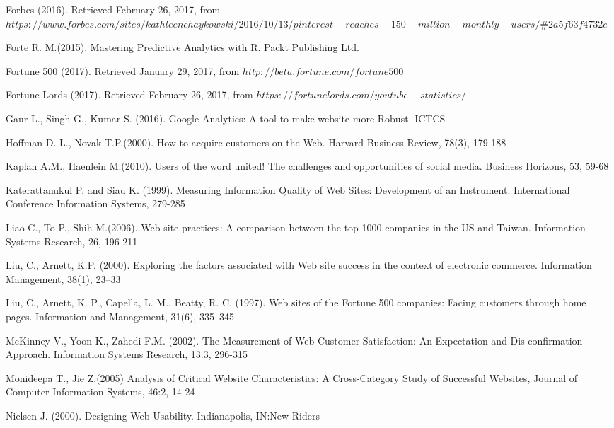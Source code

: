 \documentclass{book}
\begin{document}
\begin{thebibliography}{widest-label}
Forbes (2016). Retrieved February 26, 2017, from $https://www.forbes.com/sites/kathleenchaykowski/2016/10/13/pinterest-reaches-150-million-monthly-users/$\#$2a5f63f4732e$

Forte R. M.(2015). Mastering Predictive Analytics with R. Packt Publishing Ltd.

Fortune 500 (2017). Retrieved January 29, 2017, from $http://beta.fortune.com/fortune500$

Fortune Lords (2017). Retrieved February 26, 2017, from $https://fortunelords.com/youtube-statistics/$

Gaur L., Singh G., Kumar S. (2016). Google Analytics: A tool to make website more Robust. ICTCS

Hoffman D. L., Novak T.P.(2000). How to acquire customers on the Web. Harvard Business Review, 78(3), 179-188

Kaplan A.M., Haenlein M.(2010). Users of the word united! The challenges and opportunities of social media. Business Horizons, 53, 59-68

Katerattanukul P. and Siau K. (1999). Measuring Information Quality of Web Sites: Development of an Instrument. 
International Conference Information Systems, 279-285

 Liao C., To P., Shih M.(2006). Web site practices: A comparison between the top 1000 companies in the US and Taiwan. Information Systems Research, 26, 196-211

 Liu, C., Arnett, K.P. (2000). Exploring the factors associated with Web site success in the context
of electronic commerce. Information Management, 38(1), 23–33

 Liu, C., Arnett, K. P., Capella, L. M., Beatty, R. C. (1997). Web sites of the Fortune 500 companies: Facing customers through home pages. Information and Management, 31(6), 335–345

McKinney V., Yoon K., Zahedi F.M. (2002). The
Measurement of Web-Customer Satisfaction: An Expectation and Dis confirmation Approach. Information Systems Research, 13:3, 296-315

 Monideepa T., Jie Z.(2005) Analysis of Critical Website Characteristics: A Cross-Category Study of Successful Websites, Journal of Computer Information Systems, 46:2, 14-24

Nielsen J. (2000). Designing Web Usability. Indianapolis, IN:New Riders


\end{thebibliography}
\end{document}
